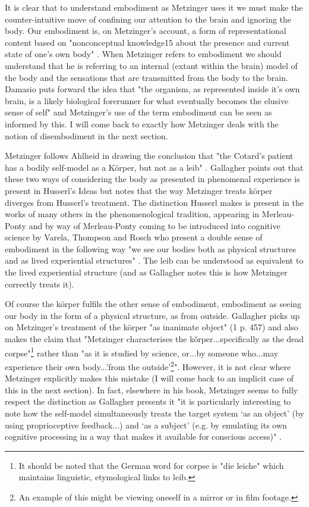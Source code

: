 It is clear that to understand embodiment as Metzinger uses it we must make the counter-intuitive move of confining our attention to the brain and ignoring the body. Our embodiment is, on Metzinger's account, a form of representational content based on "nonconceptual knowledge15 about the presence and current state of one's own body" \cite[p. 287]{metzinger2003}. When Metzinger refers to embodiment we should understand that he is referring to an internal (extant within the brain) model of the body and the sensations that are transmitted from the body to the brain. Damasio puts forward the idea that "the organism, as represented inside it's own brain, is a likely biological forerunner for what eventually becomes the elusive sense of self" \cite[p. 22]{damasio2000} and Metzinger's use of the term embodiment can be seen as informed by this. I will come back to exactly how Metzinger deals with the notion of disembodiment in the next section.

Metzinger follows Ahlheid \cite{ahlheid1968} in drawing the conclusion that "the Cotard's patient has a bodily self-model as a K\"{o}rper, but not as a leib" \cite[p. 457]{metzinger2003}. Gallagher \cite{gallagher2005} points out that these two ways of considering the body as presented in phenomenal experience is present in Husserl's Ideas \cite{husserl1931} but notes that the way Metzinger treats k\"{o}rper diverges from Husserl's treatment. The distinction Husserl makes is present in the works of many others in the phenomenological tradition, appearing in Merleau-Ponty \cite{merleauponty1962} and by way of Merleau-Ponty coming to be introduced into cognitive science by Varela, Thompson and Rosch who present a double sense of embodiment in the following way "we see our bodies both as physical structures and as lived experiential structures" \cite[p. 1]{varela1991}. The leib can be understood as equivalent to the lived experiential structure (and as Gallagher notes this is how Metzinger correctly treats it).

Of course the k\"{o}rper fulfils the other sense of embodiment, embodiment as seeing our body in the form of a physical structure, as from outside. Gallagher picks up on Metzinger's treatment of the k\"{o}rper "as inanimate object" (1 p. 457) and also makes the claim that "Metzinger characterises the k\"{o}̈rper...specifically as the dead corpse"\footnote{It should be noted that the German word for corpse is "die leiche" which maintains linguistic, etymological links to leib.} \cite[p. 3]{gallagher2005} rather than "as it is studied by science, or...by someone who...may experience their own body...'from the outside'\footnote{An example of this might be viewing oneself in a mirror or in film footage.}"\cite[p. 3]{gallagher2005}. However, it is not clear where Metzinger explicitly makes this mistake (I will come back to an implicit case of this in the next section). In fact, elsewhere in his book, Metzinger seems to fully respect the distinction as Gallagher presents it "it is particularly interesting to note how the self-model simultaneously treats the target system ‘as an object' (by using proprioceptive feedback...) and ‘as a subject' (e.g. by emulating its own cognitive processing in a way that makes it available for conscious access)" \cite[p. 301]{metzinger2003}.


